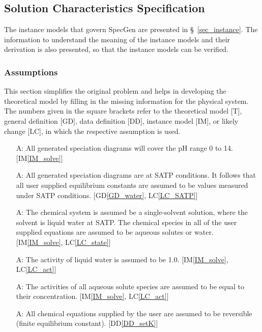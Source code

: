 \documentclass[12pt]{article}
\newcommand{\dref}[1]{GD\ref{#1}}
\newcommand{\ddref}[1]{DD\ref{#1}}
\newcounter{assumpnum} %
\newcommand{\iref}[1]{IM\ref{#1}}
\newcommand{\lcref}[1]{LC\ref{#1}}
\newcommand{\sref}[1]{\S~\ref{#1}}
\newcommand{\progname}{SpecGen} %
\begin{document}

\subsection{Solution Characteristics Specification}

The instance models that govern \progname{} are presented in
\sref{sec_instance}.  The information to understand the meaning of the
instance models and their derivation is also presented, so that the instance
models can be verified.

\subsubsection{Assumptions}

This section simplifies the original problem and helps in developing the
theoretical model by filling in the missing information for the physical
system. The numbers given in the square brackets refer to the theoretical model
[T], general definition [GD], data definition [DD], instance model [IM], or
likely change [LC], in which the respective assumption is used.

\begin{itemize}
\item[A\refstepcounter{assumpnum}\theassumpnum \label{A_pH}:]
  All generated speciation diagrams will cover the pH range 0 to 14. [\iref{IM_solve}]
\item[A\refstepcounter{assumpnum}\theassumpnum \label{A_SATP}:]
  All generated speciation diagrams are at SATP conditions.  It follows that all user supplied equilibrium constants are assumed to be values measured under SATP conditions. [\dref{GD_water}, \lcref{LC_SATP}]
\item[A\refstepcounter{assumpnum}\theassumpnum \label{A_only_aq}:]
  The chemical system is assumed be a single-solvent solution, where the solvent is liquid water at SATP.  The chemical species in all of the user supplied equations are assumed to be aqueous solutes or water. [\iref{IM_solve}, \lcref{LC_state}]
\item[A\refstepcounter{assumpnum}\theassumpnum \label{A_act_wat}:]
  The activity of liquid water is assumed to be 1.0. [\iref{IM_solve}, \lcref{LC_act}]
\item[A\refstepcounter{assumpnum}\theassumpnum \label{A_act_aq}:]
  The activities of all aqueous solute species are assumed to be equal to their concentration. [\iref{IM_solve}, \lcref{LC_act}]
\item[A\refstepcounter{assumpnum}\theassumpnum \label{A_rev}:]
  All chemical equations supplied by the user are assumed to be reversible (finite equilibrium constant). [\ddref{DD_setK}]
\end{itemize}
\end{document}
